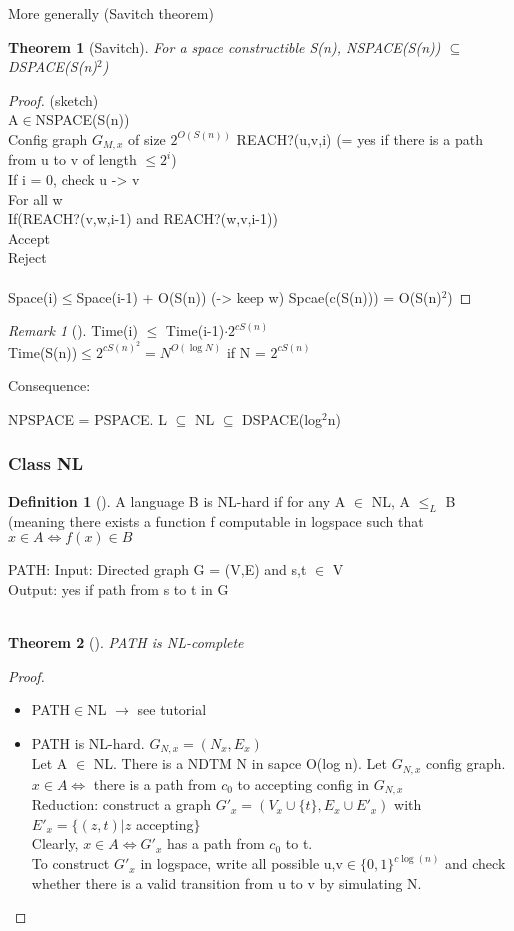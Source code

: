 \documentclass{article}
\newtheorem{theorem}{Theorem}
\theoremstyle{definition}
\newtheorem{definition}{Definition}
\theoremstyle{remark}
\newtheorem*{remark}{Remark}
\newcommand{\Thm}[3]{\begin{theorem}[#1]\label{#2}#3\end{theorem}}
\newcommand{\Def}[3]{\begin{definition}[#1]\label{#2}#3\end{definition}}
\newcommand{\Rem}[3]{\begin{remark}[#1]\label{#2}#3\end{remark}}
\newcommand{\Proof}[1]{\begin{proof}#1\end{proof}}
\begin{document}
More generally (Savitch theorem)
\Thm{Savitch}{}{For a space constructible S(n), NSPACE(S(n)) $\subseteq$ DSPACE(S(n)$^2$)}
\Proof{(sketch)\\
	A$\in$NSPACE(S(n))\\
	Config graph $G_{M,x}$ of size $2^{O(S(n))}$
	REACH?(u,v,i) (= yes if there is a path from u to v of length $\leq 2^i$)\\
		If i = 0, check u -> v\\
		For all w\\
			If(REACH?(v,w,i-1) and REACH?(w,v,i-1))\\
				Accept\\
		Reject\\\\
Space(i)$\leq$Space(i-1) + O(S(n)) (-> keep w)
Spcae(c(S(n))) = O(S(n)$^2$)
	}
	
\Rem{}{}{Time(i) $\leq$ Time(i-1)$\cdot2^{cS(n)}$\\
	Time(S(n))$\leq 2^{cS(n)^2} = N^{O(\log N)}$ if N = $2^{cS(n)}$}
	
Consequence:

NPSPACE = PSPACE. L $\subseteq$ NL $\subseteq$ DSPACE(log$^2$n)

\subsubsection{Class NL}
\Def{}{}{A language B is NL-hard if for any A $\in$ NL, A $\leq_L$ B (meaning there exists a function f computable in logspace such that $x\in A \Leftrightarrow f(x)\in B$}

PATH: Input: Directed graph G = (V,E) and s,t $\in$ V\\
Output: yes if path from s to t in G\\\\

\Thm{}{}{PATH is NL-complete}
\Proof{\begin{itemize}
		\item PATH$\in$NL $\rightarrow$ see tutorial
		\item PATH is NL-hard. $G_{N,x} = (N_x,E_x)$\\
		Let A $\in$ NL. There is a NDTM N in sapce O(log n). Let $G_{N,x}$ config graph. $x\in A \Leftrightarrow$ there is a path from $c_0$ to accepting config in $G_{N,x}$\\
		Reduction: construct a graph $G'_x = (V_x\cup\{t\},E_x\cup E'_x)$ with $E'_x = \{(z,t)|z$ accepting$\}$\\
		Clearly, $x\in A \Leftrightarrow G'_x$ has a path from $c_0$ to t.\\
		To construct $G'_x$ in logspace, write all possible u,v$\in \{0,1\}^{c\log(n)}$ and check whether there is a valid transition from u to v by simulating N.
	\end{itemize}}
\end{document}
